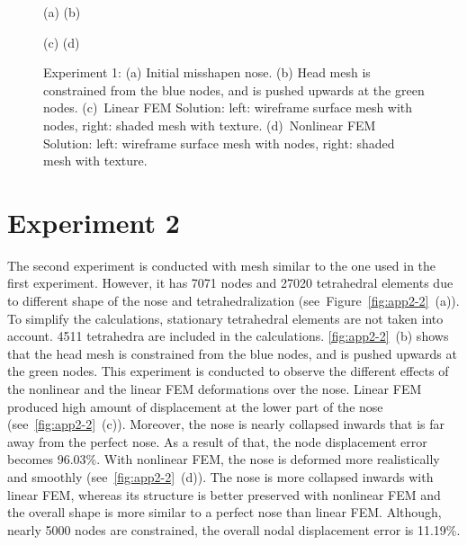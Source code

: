 \begin{figure}[b]
\centerline{
            }
\centerline{(a) \hspace*{0.45\textwidth}(b)}
\centerline{
            }
\centerline{(c) \hspace*{0.45\textwidth}(d)}
\caption{Experiment 1: (a) Initial misshapen nose. (b) Head mesh is constrained from the blue nodes, 
and is pushed upwards at the green nodes. (c)~Linear FEM Solution: left: wireframe surface mesh with nodes, 
right: shaded mesh with texture. (d)~Nonlinear FEM Solution: left: wireframe surface mesh with nodes, 
right: shaded mesh with texture.}
\label{fig:app2-1}
\end{figure}

\clearpage
\section{Experiment 2}
\label{aii}

The second experiment is conducted with mesh similar to the one used in the first experiment. However, it has 7071 nodes and 27020 tetrahedral elements due to different shape of the nose and tetrahedralization (see~Figure~\ref{fig:app2-2}~(a)). To simplify the calculations, stationary tetrahedral elements are  not taken into account. 4511 tetrahedra are included in the calculations. \ref{fig:app2-2}~(b) shows that the head mesh is constrained from the blue nodes, and is pushed upwards at the green nodes. This experiment is conducted to observe the different effects of the nonlinear and the linear FEM deformations over the nose. Linear FEM produced high amount of displacement at the lower part of the nose (see~\ref{fig:app2-2}~(c)). Moreover, the nose is nearly collapsed inwards that is far away from the perfect nose. As a result of that, the node displacement error becomes 96.03\%. With nonlinear FEM, the nose is deformed more realistically and smoothly (see~\ref{fig:app2-2}~(d)). The nose is more collapsed inwards with linear FEM, whereas its structure is better preserved with nonlinear FEM and the overall shape is more similar to a perfect nose than linear FEM. Although, nearly 5000 nodes are constrained, the overall nodal displacement error is 11.19\%.

